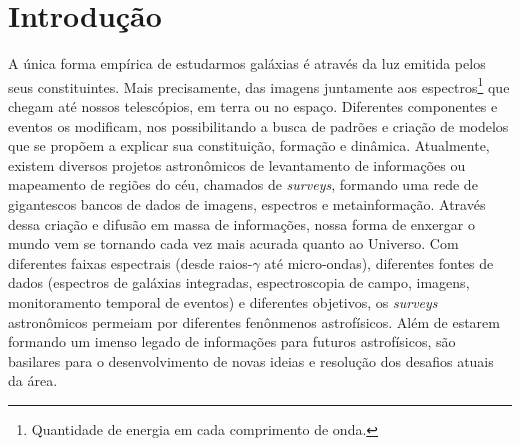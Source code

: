 



\chapter{Introdução}
\label{sec:intro}

A única forma empírica de estudarmos galáxias é através da luz emitida pelos seus constituintes. Mais precisamente, das imagens juntamente aos espectros\footnote{Quantidade de energia em cada comprimento de onda.} que chegam até nossos telescópios, em terra ou no espaço. Diferentes componentes e eventos os modificam, nos possibilitando a busca de padrões e criação de modelos que se propõem a explicar sua constituição, formação e dinâmica. Atualmente, existem diversos projetos astronômicos de levantamento de informações ou mapeamento de regiões do céu, chamados de {\em surveys}, formando uma rede de gigantescos bancos de dados de imagens, espectros e metainformação. Através dessa criação e difusão em massa de informações, nossa forma de enxergar o mundo vem se tornando cada vez mais acurada quanto ao Universo. Com diferentes faixas espectrais (desde raios-$\gamma$ até micro-ondas), diferentes fontes de dados (espectros de galáxias integradas, espectroscopia de campo, imagens, monitoramento temporal de eventos) e diferentes objetivos, os {\em surveys} astronômicos permeiam por diferentes fenônmenos astrofísicos. Além de estarem formando um imenso legado de informações para futuros astrofísicos, são basilares para o desenvolvimento de novas ideias e resolução dos desafios atuais da área.


